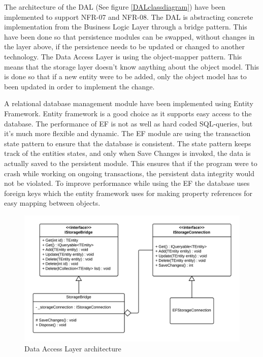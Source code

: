 \documentclass[../report.tex]{subfiles}
\begin{document}
\graphicspath{{img/}{../img/}}

The architecture of the DAL (See figure \ref{DALclassdiagram}) have been implemented to support NFR-07 and NFR-08. The DAL is abstracting concrete implementation from the Business Logic Layer through a bridge pattern. This have been done so that persistence modules can be swapped, without changes in the layer above, if the persistence needs to be updated or changed to another technology. The Data Access Layer is using the object-mapper pattern. This means that the storage layer doesn't know anything about the object model. This is done so that if a new entity were to be added, only the object model has to been updated in order to implement the change. 

A relational database management module have been implemented using Entity Framework. Entity framework is a good choice as it supports easy access to the database. The performance of EF is not as well as hard coded SQL-queries, but it's much more flexible and dynamic. The EF module are using the transaction state pattern to ensure that the database is consistent. The state pattern keeps track of the entities states, and only when Save Changes is invoked, the data is actually saved to the persistent module. This ensures that if the program were to crash while working on ongoing transactions, the persistent data integrity would not be violated. To improve performance while using the EF the database uses foreign keys which the entity framework uses for making property references for easy mapping between objects.

\begin{figure}
\centering
\includegraphics[width=\linewidth]{DALclassdiagram.png}
\caption{Data Access Layer architecture}
\label{fig:DALclassdiagram}
\end{figure} 
\end{document}
